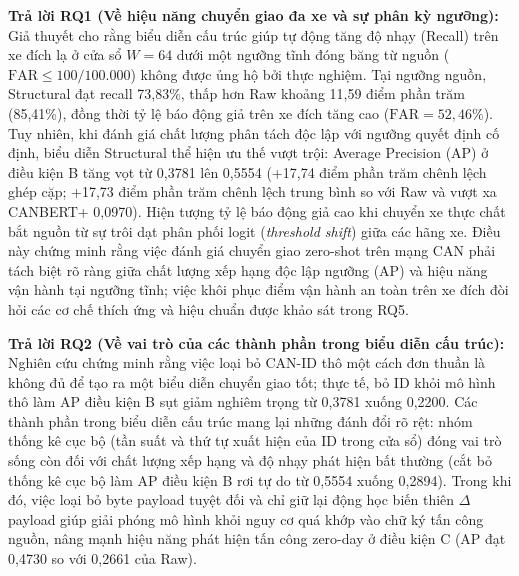 \documentclass[12pt, a4paper, reqno, oneside]{book}
\begin{document}
\textbf{Trả lời RQ1 (Về hiệu năng chuyển giao đa xe và sự phân kỳ ngưỡng):}
Giả thuyết cho rằng biểu diễn cấu trúc giúp tự động tăng độ nhạy (Recall) trên xe đích lạ ở cửa sổ $W=64$ dưới một ngưỡng tĩnh đóng băng từ nguồn ($\text{FAR} \le 100/100.000$) không được ủng hộ bởi thực nghiệm. Tại ngưỡng nguồn, Structural đạt recall 73,83\%, thấp hơn Raw khoảng 11,59 điểm phần trăm (85,41\%), đồng thời tỷ lệ báo động giả trên xe đích tăng cao ($\text{FAR} = 52{,}46\%$). Tuy nhiên, khi đánh giá chất lượng phân tách độc lập với ngưỡng quyết định cố định, biểu diễn Structural thể hiện ưu thế vượt trội: Average Precision (AP) ở điều kiện B tăng vọt từ 0,3781 lên 0,5554 (+17,74 điểm phần trăm chênh lệch ghép cặp; +17,73 điểm phần trăm chênh lệch trung bình so với Raw và vượt xa CANBERT+ 0,0970). Hiện tượng tỷ lệ báo động giả cao khi chuyển xe thực chất bắt nguồn từ sự trôi dạt phân phối logit (\textit{threshold shift}) giữa các hãng xe. Điều này chứng minh rằng việc đánh giá chuyển giao zero-shot trên mạng CAN phải tách biệt rõ ràng giữa chất lượng xếp hạng độc lập ngưỡng (AP) và hiệu năng vận hành tại ngưỡng tĩnh; việc khôi phục điểm vận hành an toàn trên xe đích đòi hỏi các cơ chế thích ứng và hiệu chuẩn được khảo sát trong RQ5.

\textbf{Trả lời RQ2 (Về vai trò của các thành phần trong biểu diễn cấu trúc):}
Nghiên cứu chứng minh rằng việc loại bỏ CAN-ID thô một cách đơn thuần là không đủ để tạo ra một biểu diễn chuyển giao tốt; thực tế, bỏ ID khỏi mô hình thô làm AP điều kiện B sụt giảm nghiêm trọng từ 0,3781 xuống 0,2200. Các thành phần trong biểu diễn cấu trúc mang lại những đánh đổi rõ rệt: nhóm thống kê cục bộ (tần suất và thứ tự xuất hiện của ID trong cửa sổ) đóng vai trò sống còn đối với chất lượng xếp hạng và độ nhạy phát hiện bất thường (cắt bỏ thống kê cục bộ làm AP điều kiện B rơi tự do từ 0,5554 xuống 0,2894). Trong khi đó, việc loại bỏ byte payload tuyệt đối và chỉ giữ lại động học biến thiên $\Delta$payload giúp giải phóng mô hình khỏi nguy cơ quá khớp vào chữ ký tấn công nguồn, nâng mạnh hiệu năng phát hiện tấn công zero-day ở điều kiện C (AP đạt 0,4730 so với 0,2661 của Raw).
\end{document}
